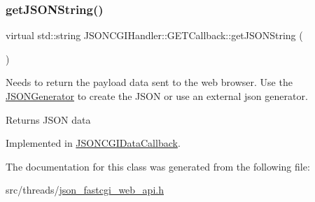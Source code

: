 \subsubsection{\texorpdfstring{get\+J\+S\+O\+N\+String()}{getJSONString()}}
{\footnotesize\ttfamily virtual std\+::string J\+S\+O\+N\+C\+G\+I\+Handler\+::\+G\+E\+T\+Callback\+::get\+J\+S\+O\+N\+String (\begin{DoxyParamCaption}{ }\end{DoxyParamCaption})\hspace{0.3cm}{\ttfamily [pure virtual]}}

Needs to return the payload data sent to the web browser. Use the \hyperlink{classJSONCGIHandler_1_1JSONGenerator}{J\+S\+O\+N\+Generator} to create the J\+S\+ON or use an external json generator. \begin{DoxyReturn}{Returns}
J\+S\+ON data 
\end{DoxyReturn}


Implemented in \hyperlink{classJSONCGIDataCallback_a3ca67affb4f88f8c5a1f7f04b4bbc0ef}{J\+S\+O\+N\+C\+G\+I\+Data\+Callback}.



The documentation for this class was generated from the following file\+:\begin{DoxyCompactItemize}
\item 
src/threads/\hyperlink{json__fastcgi__web__api_8h}{json\+\_\+fastcgi\+\_\+web\+\_\+api.\+h}\end{DoxyCompactItemize}
